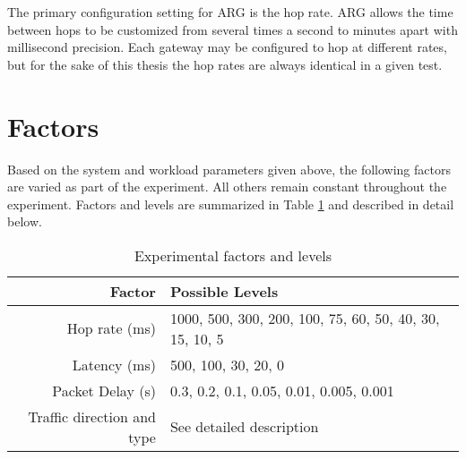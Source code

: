 \par The primary configuration setting for \ac{ARG} is the hop rate. \ac{ARG} allows the time between hops to be customized from several times a second to minutes apart with millisecond precision. Each gateway may be configured to hop at different rates, but for the sake of this thesis the hop rates are always identical in a given test.

\section{Factors}
\FloatBarrier
\label{sec:factors}
\par Based on the system and workload parameters given above, the following factors are varied as part of the experiment. All others remain constant throughout the experiment. Factors and levels are summarized in Table \ref{tbl:factors} and described in detail below.

\begin{table}
\begin{center}
	\caption{Experimental factors and levels}
	\label{tbl:factors}
	
	\begin{tabular}{r|l}
	\textbf{Factor} & \textbf{Possible Levels } \\
	\hline
	Hop rate (ms) & 1000, 500, 300, 200, 100, 75, 60, 50, 40, 30, 15, 10, 5\\
	Latency (ms) & 500, 100, 30, 20, 0\\
	Packet Delay (s) & 0.3, 0.2, 0.1, 0.05, 0.01, 0.005, 0.001\\
	Traffic direction and type & See detailed description
	\end{tabular}
\end{center}
\end{table}

